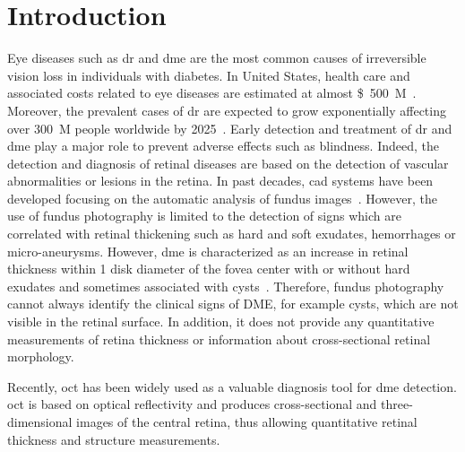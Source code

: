 \graphicspath{ {./content/intro/figures/} }

\section{Introduction}

Eye diseases such as \ac{dr} and \ac{dme} are the most common causes of irreversible vision loss in individuals with diabetes.
In United States, health care and associated costs related to eye diseases are estimated at almost \SI{500}[\$]{M}~\cite{Sharma2005}.
Moreover, the prevalent cases of \ac{dr} are expected to grow exponentially affecting over \SI{300}{M} people worldwide by 2025~\cite{Wild2004}.
Early detection and treatment of \ac{dr} and \ac{dme} play a major role to prevent adverse effects such as blindness.
Indeed, the detection and diagnosis of retinal diseases are based on the detection of vascular abnormalities or lesions in the retina. 
In past decades, \ac{cad} systems have been developed focusing on the automatic analysis of fundus images~\cite{Abramoff2010,Trucco2013}.
However, the use of fundus photography is limited to the detection of signs which are correlated with retinal thickening such as hard and soft exudates, hemorrhages or micro-aneurysms.
However, \ac{dme} is characterized as an increase in retinal thickness within 1 disk diameter of the fovea center with or without hard exudates and sometimes associated with cysts~\cite{ETDRSG1985}.
Therefore, fundus photography cannot always identify the clinical signs of DME, for example cysts, which are not visible in the retinal surface. In addition, it does not provide any quantitative measurements of retina thickness or information about cross-sectional retinal morphology. 

Recently, \ac{oct} has been widely used as a valuable diagnosis tool for \ac{dme} detection.
\ac{oct} is based on optical reflectivity and produces cross-sectional and three-dimensional images of the central retina, thus allowing quantitative retinal thickness and structure measurements. 

